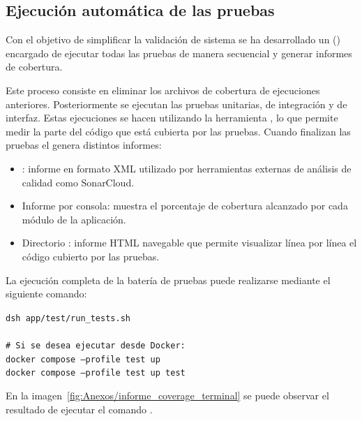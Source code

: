 \subsection{Ejecución automática de las pruebas}

Con el objetivo de simplificar la validación de sistema se ha desarrollado un  () encargado de ejecutar todas las pruebas de manera secuencial y generar informes de cobertura. 

Este proceso consiste en eliminar los archivos de cobertura de ejecuciones anteriores. Posteriormente se ejecutan las pruebas unitarias, de integración y de interfaz. Estas ejecuciones se hacen utilizando la herramienta , lo que permite medir la parte del código que está cubierta por las pruebas. Cuando finalizan las pruebas el  genera distintos informes:
\begin{itemize}
\tightlist
	\item {}: informe en formato XML utilizado por herramientas externas de análisis de calidad como SonarCloud.
	\item Informe por consola: muestra el porcentaje de cobertura alcanzado por cada módulo de la aplicación.
	\item Directorio : informe HTML navegable que permite visualizar línea por línea el código cubierto por las pruebas.
\end{itemize}

La ejecución completa de la batería de pruebas puede realizarse mediante el siguiente comando:

\begin{tcolorbox}[
	colback=black!3,
	colframe=black!30,
	boxrule=0.5pt,
	arc=2mm,
	title= Terminal - Ejecución de pruebas,
	fonttitle=\bfseries,
	breakable 
]
	{\footnotesize
		\noindent
		\texttt{dsh app/test/run\_tests.sh}\\
		\\
		\texttt{\# Si se desea ejecutar desde Docker:}\\
		\texttt{docker compose --profile test up}\\
		\texttt{docker compose --profile test up test}
	}
\end{tcolorbox}

En la imagen~\ref{fig:Anexos/informe_coverage_terminal} se puede observar el resultado de ejecutar el comando .


